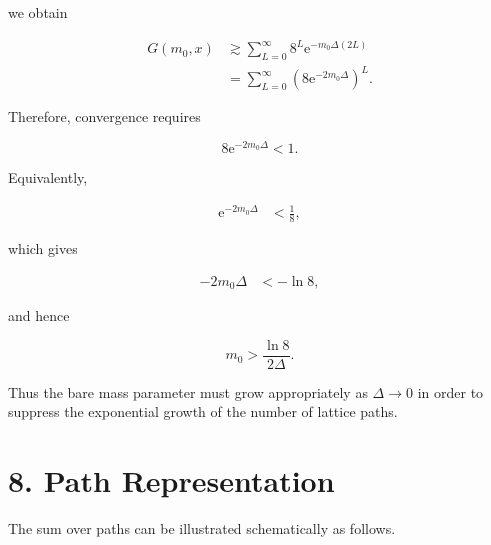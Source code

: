 \documentclass[12pt,a4paper]{article}
\newcommand{\ee}{\mathrm{e}}
\begin{document}
we obtain

\begin{align}
    G(m_0,x)
    &\gtrsim
    \sum_{L=0}^{\infty}
    8^L
    \ee^{-m_0\Delta(2L)}
    \\
    &=
    \sum_{L=0}^{\infty}
    \left(
        8\ee^{-2m_0\Delta}
    \right)^L.
\end{align}

Therefore, convergence requires

\begin{equation}
    8\ee^{-2m_0\Delta}<1.
\end{equation}

Equivalently,

\begin{align}
    \ee^{-2m_0\Delta}
    &<
    \frac{1}{8},
\end{align}

which gives

\begin{align}
    -2m_0\Delta
    &<
    -\ln 8,
\end{align}

and hence

\begin{equation}
    \boxed{
    m_0
    >
    \frac{\ln 8}{2\Delta}
    }.
\end{equation}

Thus the bare mass parameter must grow appropriately as
$\Delta\rightarrow0$ in order to suppress the exponential growth
of the number of lattice paths.


\section*{8. Path Representation}

The sum over paths can be illustrated schematically as follows.
\end{document}
